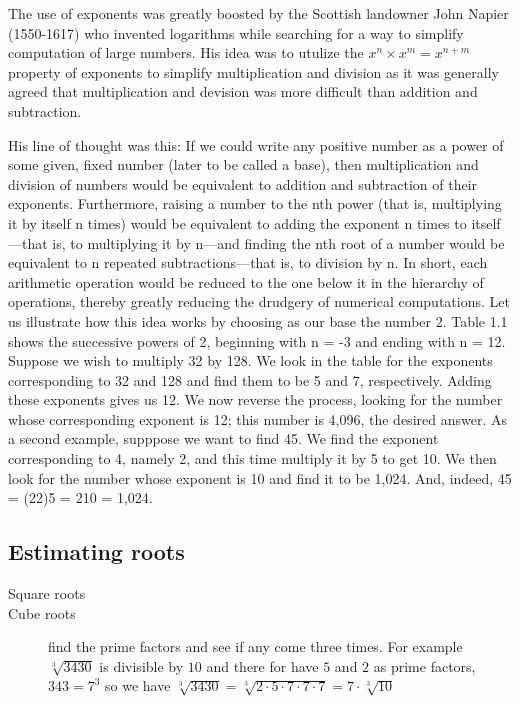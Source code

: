 The use of exponents was greatly boosted by the Scottish landowner {John Napier} (1550-1617) who invented {logarithms} while searching for a way to simplify computation of large numbers. His idea was to utulize the $x^n \times x^m = x^{n+m}$ property of exponents to simplify multiplication and division as it was generally agreed that multiplication and devision was more difficult than addition and subtraction. 

His line of thought was this: If we could write any positive number as a power of some given, fixed number (later to be called a base), then multiplication and division of numbers would be equivalent to addition and subtraction of their exponents. Furthermore, raising a number to the nth power (that is, multiplying it by itself n times) would be equivalent to adding the exponent n times to itself—that is, to multiplying it by n—and finding the nth root of a number would be equivalent to n repeated subtractions—that is, to division by n. In short, each arithmetic operation would be reduced to the one below it in the hierarchy of operations, thereby greatly reducing the drudgery of numerical computations. Let us illustrate how this idea works by choosing as our base the number 2. Table 1.1 shows the successive powers of 2, beginning with n = -3 and ending with n = 12. Suppose we wish to multiply 32 by 128. We look in the table for the exponents corresponding to 32 and 128 and find them to be 5 and 7, respectively. Adding these exponents gives us 12. We now reverse the process, looking for the number whose corresponding exponent is 12; this number is 4,096, the desired answer. As a second example, supppose we want to find 45. We find the exponent corresponding to 4, namely 2, and this time multiply it by 5 to get 10. We then look for the number whose exponent is 10 and find it to be 1,024. And, indeed, 45 = (22)5 = 210 = 1,024.


\subsection{Estimating roots}
\begin{description}
\item [Square roots]
\item [Cube roots] find the prime factors and see if any come three times. For example $\sqrt[3]{3430}$ is divisible by $10$ and there for have $5$ and $2$ as prime factors, $343 = 7^3$ so we have $\sqrt[3]{3430} = \sqrt[3]{2 \cdot 5 \cdot 7 \cdot 7 \cdot 7} = 7 \cdot \sqrt[3]{10}$
\end{description}



